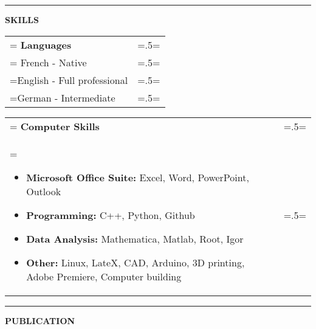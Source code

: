 \documentclass[letterpaper, 11pt]{article}
\begin{document}
\begin{center}
\noindent\rule{0.75\textwidth}{1pt}
\end{center}

\begin{center}
\large\bf{SKILLS}
\end{center}

\begin{tabularx}{1.0\textwidth} { 
   >{\raggedright\arraybackslash\hsize=1.5\hsize\linewidth=\hsize}X 
   >{\raggedleft\arraybackslash\hsize=.5\hsize\linewidth=\hsize}X }
\normalsize
\bf{Languages} & \\
\normalfont
French - Native & \\
English - Full professional & \\
German - Intermediate 
\end{tabularx}
\vspace{0.25cm}

\begin{tabularx}{1.0\textwidth} { 
   >{\raggedright\arraybackslash\hsize=1.5\hsize\linewidth=\hsize}X 
   >{\raggedleft\arraybackslash\hsize=.5\hsize\linewidth=\hsize}X }
\normalsize
\bf{Computer Skills} & \\
\normalfont \begin{itemize}[leftmargin=*,noitemsep,topsep=0pt]
\item \textbf{Microsoft Office Suite:}  Excel, Word, PowerPoint, Outlook
\item \textbf{Programming:} C++, Python, Github
\item \textbf{Data Analysis:} Mathematica, Matlab, Root, Igor
\item \textbf{Other:} Linux, LateX, CAD, Arduino, 3D printing, Adobe Premiere, Computer building
\end{itemize} & 
\end{tabularx}

\begin{center}
\noindent\rule{0.75\textwidth}{1pt}
\end{center}

\begin{center}
\large\bf{PUBLICATION}
\end{center}

\nocite{*}

\printbibliography[title=\normalsize Master Thesis]

\end{document}
